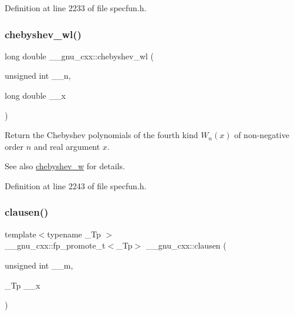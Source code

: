 Definition at line 2233 of file specfun.\+h.

\mbox{\label{group__gnu__math__spec__func_ga1297dfd9b9a0f584435de7d83eb9e9c3}} 
\subsubsection{\texorpdfstring{chebyshev\+\_\+wl()}{chebyshev\_wl()}}
{\footnotesize\ttfamily long double \+\_\+\+\_\+gnu\+\_\+cxx\+::chebyshev\+\_\+wl (\begin{DoxyParamCaption}\item[{unsigned int}]{\+\_\+\+\_\+n,  }\item[{long double}]{\+\_\+\+\_\+x }\end{DoxyParamCaption})\hspace{0.3cm}{\ttfamily [inline]}}

Return the Chebyshev polynomials of the fourth kind $ W_n(x) $ of non-\/negative order $ n $ and real argument $ x $.

\begin{DoxySeeAlso}{See also}
\hyperlink{group__gnu__math__spec__func_gaa156c6c21e99104ebcb627e92aceada0}{chebyshev\+\_\+w} for details. 
\end{DoxySeeAlso}


Definition at line 2243 of file specfun.\+h.

\mbox{\label{group__gnu__math__spec__func_ga54e4ba71b1f81718d6998349f91ff88f}} 
\subsubsection{\texorpdfstring{clausen()}{clausen()}\hspace{0.1cm}{\footnotesize\ttfamily [1/2]}}
{\footnotesize\ttfamily template$<$typename \+\_\+\+Tp $>$ \\
\+\_\+\+\_\+gnu\+\_\+cxx\+::fp\+\_\+promote\+\_\+t$<$\+\_\+\+Tp$>$ \+\_\+\+\_\+gnu\+\_\+cxx\+::clausen (\begin{DoxyParamCaption}\item[{unsigned int}]{\+\_\+\+\_\+m,  }\item[{\+\_\+\+Tp}]{\+\_\+\+\_\+x }\end{DoxyParamCaption})\hspace{0.3cm}{\ttfamily [inline]}}

